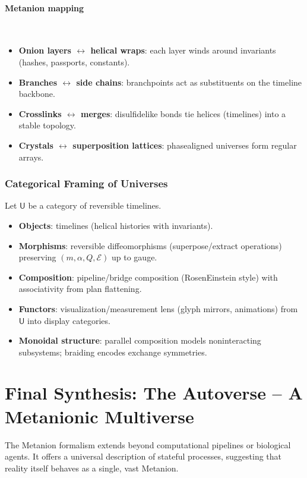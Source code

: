 \documentclass{article}
\begin{document}
\paragraph{Metanion mapping}\mbox{}\\
\begin{itemize}
  \item \textbf{Onion layers $\leftrightarrow$ helical wraps}: each layer winds around invariants (hashes, passports, constants).
  \item \textbf{Branches $\leftrightarrow$ side chains}: branchpoints act as substituents on the timeline backbone.
  \item \textbf{Crosslinks $\leftrightarrow$ merges}: disulfide\textendash like bonds tie helices (timelines) into a stable topology.
  \item \textbf{Crystals $\leftrightarrow$ superposition lattices}: phase\textendash aligned universes form regular arrays.
\end{itemize}

\subsubsection{Categorical Framing of Universes}
Let $\mathsf{U}$ be a category of reversible timelines.
\begin{itemize}
  \item \textbf{Objects}: timelines (helical histories with invariants).
  \item \textbf{Morphisms}: reversible diffeomorphisms (superpose/extract operations) preserving $(m,\alpha,Q,\mathcal{E})$ up to gauge.
  \item \textbf{Composition}: pipeline/bridge composition (Rosen\textendash Einstein style) with associativity from plan flattening.
  \item \textbf{Functors}: visualization/measurement lens (glyph mirrors, animations) from $\mathsf{U}$ into display categories.
  \item \textbf{Monoidal structure}: parallel composition models non\textendash interacting subsystems; braiding encodes exchange symmetries.
\end{itemize}



\section{Final Synthesis: The Autoverse -- A Metanionic Multiverse}
The Metanion formalism extends beyond computational pipelines or biological agents. It offers a universal description of stateful processes, suggesting that reality itself behaves as a single, vast Metanion.
\end{document}
